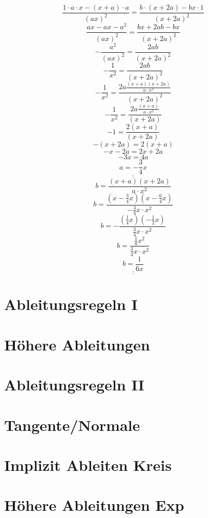 \[ \frac{1 \cdot a \cdot x - (x + a) \cdot a}{(a x)^2} = \frac{b \cdot (x + 2 a) - b x \cdot 1}{(x + 2 a)^2} \]
\[ \frac{a x - a x - a^2}{(a x)^2} = \frac{b x + 2 a b - b x}{(x + 2 a)^2} \]
\[ -\frac{a^2}{(a x)^2} = \frac{2 a b}{(x + 2 a)^2} \]
\[ -\frac{1}{x^2} = \frac{2 a b}{(x + 2 a)^2} \]
\[ -\frac{1}{x^2} = \frac{2 a \frac{(x + a)(x + 2 a)}{a \cdot x^2}}{(x + 2 a)^2} \]
\[ -\frac{1}{x^2} = \frac{2 a \frac{(x + a)}{a \cdot x^2}}{(x + 2 a)} \]
\[ -1 = \frac{2 (x + a)}{(x + 2 a)} \]
\[ -(x + 2 a) = 2 (x + a) \]
\[ -x - 2 a = 2 x + 2 a \]
\[ -3 x = 4 a \]
\[ \underline{\underline{a = -\frac{3}{4} x}} \]
\[ b = \frac{(x + a)(x + 2 a)}{a \cdot x^2} \]
\[ b = \frac{(x -\frac{3}{4} x)(x - \frac{6}{4} x)}{-\frac{3}{4} x \cdot x^2} \]
\[ b = -\frac{(\frac{1}{4} x)(- \frac{1}{2} x)}{\frac{3}{4} x \cdot x^2} \]
\[ b = \frac{\frac{1}{8} x^2}{\frac{3}{4} x \cdot x^2} \]
\[ \underline{\underline{b = \frac{1}{6 x} }} \]

\section{Ableitungsregeln I}


\section{Höhere Ableitungen}


\section{Ableitungsregeln II}


\section{Tangente/Normale}


\section{Implizit Ableiten Kreis}


\section{Höhere Ableitungen Exp}

